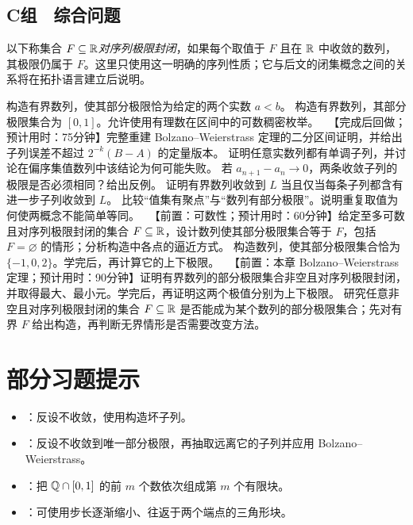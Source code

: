 \subsection*{C组　综合问题}

以下称集合 \(F\subseteq\mathbb{R}\)\emph{对序列极限封闭}，如果每个取值于
\(F\) 且在 \(\mathbb{R}\) 中收敛的数列，其极限仍属于 \(F\)。这里只使用这一明确的序列性质；它与后文的闭集概念之间的关系将在拓扑语言建立后说明。

\begin{enumerate}[label=\textbf{\thechapter.\arabic*.},resume]
  构造有界数列，使其部分极限恰为给定的两个实数 \(a<b\)。
  构造有界数列，其部分极限集合为 \([0,1]\)。允许使用有理数在区间中的可数稠密枚举。
  \ 【完成后回做；预计用时：75分钟】完整重建 Bolzano--Weierstrass 定理的二分区间证明，并给出子列误差不超过 \(2^{-k}(B-A)\) 的定量版本。
  证明任意实数列都有单调子列，并讨论在偏序集值数列中该结论为何可能失败。
  若 \(a_{n+1}-a_n\to0\)，两条收敛子列的极限是否必须相同？给出反例。
  证明有界数列收敛到 \(L\) 当且仅当每条子列都含有进一步子列收敛到 \(L\)。
  比较“值集有聚点”与“数列有部分极限”。说明重复取值为何使两概念不能简单等同。
  \ 【前置：可数性；预计用时：60分钟】给定至多可数且对序列极限封闭的集合 \(F\subseteq\mathbb{R}\)，设计数列使其部分极限集合等于 \(F\)，包括 \(F=\varnothing\) 的情形；分析构造中各点的逼近方式。
  构造数列，使其部分极限集合恰为 \(\{-1,0,2\}\)。学完后，再计算它的上下极限。
  \ 【前置：本章 Bolzano--Weierstrass 定理；预计用时：90分钟】证明有界数列的部分极限集合非空且对序列极限封闭，并取得最大、最小元。学完后，再证明这两个极值分别为上下极限。
  研究任意非空且对序列极限封闭的集合 \(F\subseteq\mathbb{R}\) 是否能成为某个数列的部分极限集合；先对有界 \(F\) 给出构造，再判断无界情形是否需要改变方法。
\end{enumerate}

\section*{部分习题提示}
\begin{itemize}
 \item {}：反设不收敛，使用构造坏子列。
 \item {}：反设不收敛到唯一部分极限，再抽取远离它的子列并应用 Bolzano--Weierstrass。
 \item {}：把 \(\mathbb{Q}\cap[0,1]\) 的前 \(m\) 个数依次组成第 \(m\) 个有限块。
 \item {}：可使用步长逐渐缩小、往返于两个端点的三角形块。
\end{itemize}
